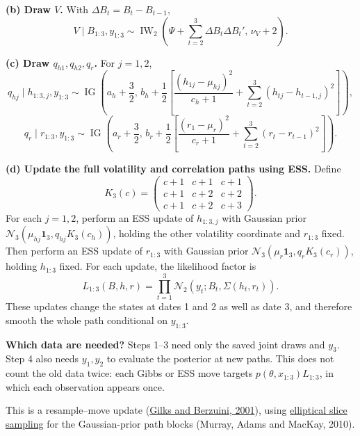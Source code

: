 \documentclass[10pt,a4paper]{article}
\newcommand{\N}{\mathcal N}
\newcommand{\IG}{\operatorname{IG}}
\newcommand{\IW}{\operatorname{IW}}
\begin{document}
\textbf{(b) Draw $V$.}
With $\Delta B_t=B_t-B_{t-1}$,
\[
V\mid B_{1:3},y_{1:3}\sim
\IW_2\!\left(\Psi+\sum_{t=2}^3\Delta B_t\Delta B_t',\,\nu_V+2\right).
\]

\textbf{(c) Draw $q_{h1},q_{h2},q_r$.}
For $j=1,2$,
\[
q_{hj}\mid h_{1:3,j},y_{1:3}\sim
\IG\!\left(a_h+\frac32,\,
b_h+\frac12\left[
\frac{(h_{1j}-\mu_{hj})^2}{c_h+1}
+\sum_{t=2}^3(h_{tj}-h_{t-1,j})^2\right]\right),
\]
\[
q_r\mid r_{1:3},y_{1:3}\sim
\IG\!\left(a_r+\frac32,\,
b_r+\frac12\left[
\frac{(r_1-\mu_r)^2}{c_r+1}
+\sum_{t=2}^3(r_t-r_{t-1})^2\right]\right).
\]

\textbf{(d) Update the full volatility and correlation paths using ESS.}
Define
\[
K_3(c)=\begin{pmatrix}
c+1&c+1&c+1\\
c+1&c+2&c+2\\
c+1&c+2&c+3
\end{pmatrix}.
\]
For each $j=1,2$, perform an ESS update of $h_{1:3,j}$ with Gaussian prior
$\N_3(\mu_{hj}\mathbf1_3,q_{hj}K_3(c_h))$, holding the other volatility
coordinate and $r_{1:3}$ fixed. Then perform an ESS update of $r_{1:3}$ with
Gaussian prior $\N_3(\mu_r\mathbf1_3,q_rK_3(c_r))$, holding $h_{1:3}$ fixed.
For each update, the likelihood factor is
\[
L_{1:3}(B,h,r)=\prod_{t=1}^3\N_2(y_t;B_t,\Sigma(h_t,r_t)).
\]
These updates change the states at dates 1 and 2 as well as date 3, and therefore
smooth the whole path conditional on $y_{1:3}$.

\textbf{Which data are needed?}
Steps 1--3 need only the saved joint draws and $y_3$.
Step 4 also needs $y_1,y_2$ to evaluate the posterior at new paths.
This does not count the old data twice: each Gibbs or ESS move targets
$p(\theta,x_{1:3})L_{1:3}$, in which each observation appears once.

{\small This is a resample--move update
(\href{https://doi.org/10.1111/1467-9868.00280}{Gilks and Berzuini, 2001}),
using \href{https://proceedings.mlr.press/v9/murray10a.html}{elliptical slice sampling}
for the Gaussian-prior path blocks (Murray, Adams and MacKay, 2010).}
\end{document}
